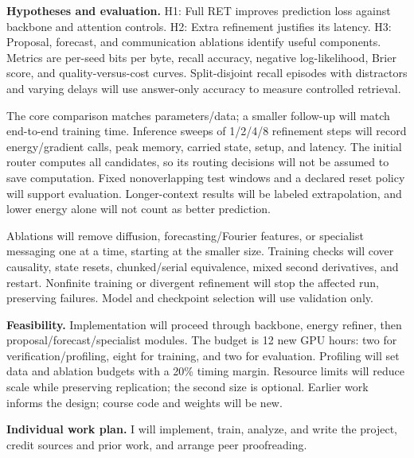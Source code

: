 \documentclass[11pt,letterpaper]{article}
\begin{document}
\textbf{Hypotheses and evaluation.} H1: Full RET improves prediction loss against backbone and attention controls. H2: Extra refinement justifies its latency. H3: Proposal, forecast, and communication ablations identify useful components. Metrics are per-seed bits per byte, recall accuracy, negative log-likelihood, Brier score, and quality-versus-cost curves. Split-disjoint recall episodes with distractors and varying delays will use answer-only accuracy to measure controlled retrieval.

The core comparison matches parameters/data; a smaller follow-up will match end-to-end training time. Inference sweeps of 1/2/4/8 refinement steps will record energy/gradient calls, peak memory, carried state, setup, and latency. The initial router computes all candidates, so its routing decisions will not be assumed to save computation. Fixed nonoverlapping test windows and a declared reset policy will support evaluation. Longer-context results will be labeled extrapolation, and lower energy alone will not count as better prediction.

Ablations will remove diffusion, forecasting/Fourier features, or specialist messaging one at a time, starting at the smaller size. Training checks will cover causality, state resets, chunked/serial equivalence, mixed second derivatives, and restart. Nonfinite training or divergent refinement will stop the affected run, preserving failures. Model and checkpoint selection will use validation only.

\textbf{Feasibility.} Implementation will proceed through backbone, energy refiner, then proposal/forecast/specialist modules. The budget is 12 new GPU hours: two for verification/profiling, eight for training, and two for evaluation. Profiling will set data and ablation budgets with a 20\% timing margin. Resource limits will reduce scale while preserving replication; the second size is optional. Earlier work informs the design; course code and weights will be new.

\textbf{Individual work plan.} I will implement, train, analyze, and write the project, credit sources and prior work, and arrange peer proofreading.
\end{document}
